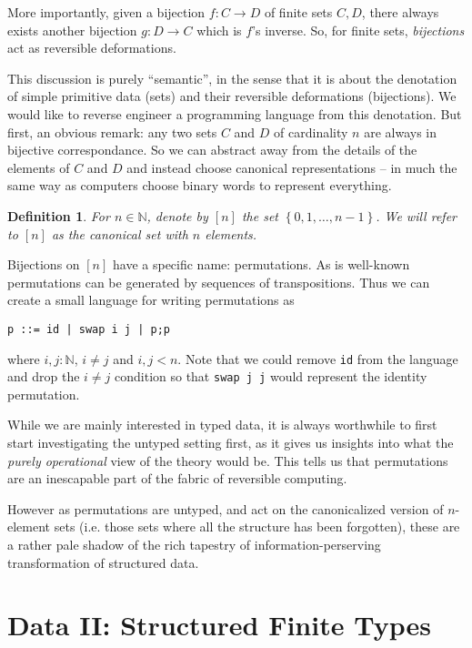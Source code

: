 \documentclass{article}
\newtheorem{defn}{Definition}[section]
\newcommand{\fin}[1]{\ensuremath{\left[#1\right]}}
\newcommand{\Nat}{\ensuremath{\mathbb{N}}}
\begin{document}
More importantly, given a bijection $f : C \rightarrow D$ of finite sets
$C,D$, there always exists another bijection $g : D \rightarrow C$ which is
$f$'s inverse. So, for finite sets, \emph{bijections} act as reversible
deformations.

This discussion is purely ``semantic'', in the sense that it is about
the denotation of simple primitive data (sets) and their reversible
deformations (bijections).  We would like to reverse engineer a programming
language from this denotation. But first, an obvious remark: any two sets
$C$ and $D$ of cardinality $n$ are always in bijective correspondance. So
we can abstract away from the details of the elements of $C$ and $D$ and
instead choose canonical representations -- in much the same way as computers
choose binary words to represent everything.

\begin{defn} For $n\in\Nat$, denote by $\fin{n}$ the set
$\left\{0,1,\ldots,n-1\right\}$.
We will refer to $\fin{n}$ as the canonical set with $n$ elements.
\end{defn}

Bijections on \fin{n} have a specific name: permutations. As is well-known
permutations can be generated by sequences of transpositions. Thus we
can create a small language for writing permutations as
\begin{verbatim}
p ::= id | swap i j | p;p
\end{verbatim}
where $i,j:\Nat$, $i\neq j$ and $i,j < n$. Note that we could remove 
\verb|id|
from the language and drop the $i\neq j$ condition so that 
\verb|swap j j| would represent the identity permutation.

While we are mainly interested in typed data, it is always worthwhile to
first start investigating the untyped setting first, as it gives us insights
into what the \emph{purely operational} view of the theory would be.
This tells us that permutations are an inescapable part of the fabric of
reversible computing. 

However as permutations are untyped, and act on the canonicalized version
of $n$-element sets (i.e. those sets where all the structure has been
forgotten), these are a rather pale shadow of the rich tapestry of
information-perserving transformation of structured data.

\section{Data II: Structured Finite Types}
\end{document}
